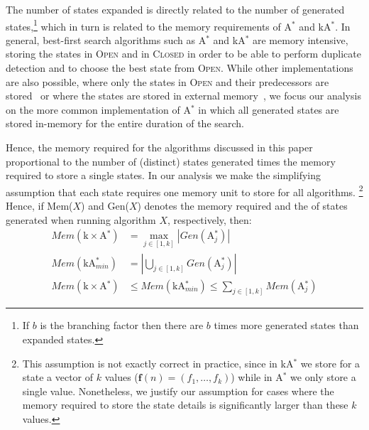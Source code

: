 \documentclass{aicom2e}
\newcommand{\astar}{A$^*$}
\newcommand{\kastar}{kA$^*$}
\newcommand{\kastarmin}{kA$^*_{min}$}
\newcommand{\kxastar}{k$\times$A$^*$}
\newcommand{\astari}[1]{A$^*_#1$}
\newcommand{\open}{\textsc{Open}}
\newcommand{\closed}{\textsc{Closed}}
\begin{document}
The number of states expanded is directly related to the number of generated
states,\footnote{If $b$ is the branching factor then there are $b$ times more
    generated states than expanded states.} which in turn is related to the memory
requirements of \astar{} and \kastar{}. In general, best-first search
algorithms such as \astar{} and \kastar{} are memory intensive, storing the
states in \open{} and in \closed{} in order to be able to perform duplicate
detection and to choose the best state from \open{}. While other
implementations are also possible, where only the states in \open{} and their
predecessors are stored~\cite{zhou2006breadth,korf2004best} or where the states
are stored in external
memory~\cite{zhou2004structured,edelkamp2016external,edelkamp2005external}, we
focus our analysis on the more common implementation of \astar{} in which all
generated states are stored in-memory for the entire duration of the search.

Hence, the memory required for the algorithms discussed in this paper
proportional to the number of (distinct) states generated times the memory
required to store a single states.
In our analysis we make the simplifying assumption that each state requires one
memory unit to store for all algorithms. \footnote{This assumption is not
exactly correct in practice, since in \kastar{} we store for a state a vector
of $k$ values ($\textbf{f}(n)=(f_1,\ldots,f_k)$)  while in \astar{} we only
store a single value. Nonetheless, we justify our assumption for cases where
the memory required to store the state details is significantly larger than
these $k$ values.} Hence, if Mem($X$) and Gen($X$) denotes the memory required
and the of states generated when running algorithm $X$, respectively, then:
\begin{align}
Mem(\text{\kxastar{}})&=\max_{j\in [1,k]}| Gen(\text{\astari{j}})| \label{eq:kxastar-mem}\\
Mem(\text{\kastarmin{}})&=|\bigcup_{j\in [1,k]} Gen(\text{\astari{j}})| \label{eq:kastar-mem}\\
Mem(\text{\kxastar{}})&\leq Mem(\text{\kastarmin{}}) \leq \sum_{j\in[1,k]} Mem(\text{\astari{j}}) \label{eq:kxastar-kastar-mem}
\end{align}
\end{document}
